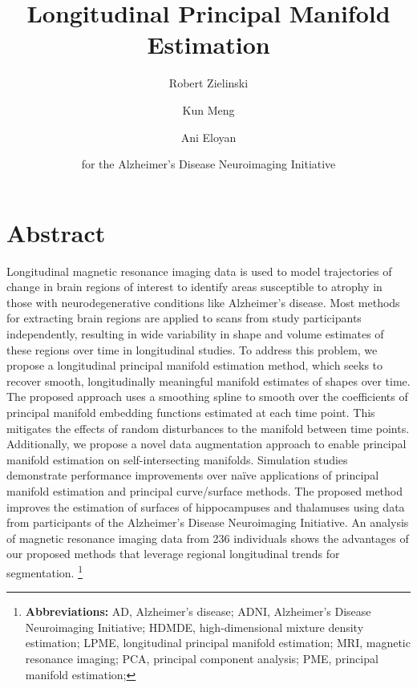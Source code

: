 \documentclass[12pt]{article}
\theoremstyle{definition}
\begin{document}
\title{Longitudinal Principal Manifold Estimation}
\author[1]{Robert Zielinski}
\author[2]{Kun Meng}
\author[1]{Ani Eloyan}
\author[*]{for the Alzheimer’s Disease Neuroimaging Initiative}



\maketitle

\doublespacing

\section*{Abstract}

Longitudinal magnetic resonance imaging data is used to model trajectories of change in brain regions of interest to identify areas susceptible to atrophy in those with neurodegenerative conditions like Alzheimer’s disease. Most methods for extracting brain regions are applied to scans from study participants independently, resulting in wide variability in shape and volume estimates of these regions over time in longitudinal studies. To address this problem, we propose a longitudinal principal manifold estimation method, which seeks to recover smooth, longitudinally meaningful manifold estimates of shapes over time. The proposed approach uses a smoothing spline to smooth over the coefficients of principal manifold embedding functions estimated at each time point. This mitigates the effects of random disturbances to the manifold between time points. Additionally, we propose a novel data augmentation approach to enable principal manifold estimation on self-intersecting manifolds. Simulation studies demonstrate performance improvements over naïve applications of principal manifold estimation and principal curve/surface methods. The proposed method improves the estimation of surfaces of hippocampuses and thalamuses using data from participants of the Alzheimer’s Disease Neuroimaging Initiative. An analysis of magnetic resonance imaging data from 236 individuals shows the advantages of our proposed methods that leverage regional longitudinal trends for segmentation. \footnote{\textbf{Abbreviations:} AD, Alzheimer's disease; ADNI, Alzheimer's Disease Neuroimaging Initiative; HDMDE, high-dimensional mixture density estimation; LPME, longitudinal principal manifold estimation; MRI, magnetic resonance imaging; PCA, principal component analysis; PME, principal manifold estimation;}
\end{document}
